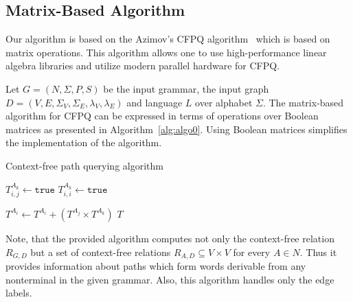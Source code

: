 \subsection{Matrix-Based Algorithm}
Our algorithm is based on the Azimov's CFPQ algorithm~\cite{Azimov:2018:CPQ:3210259.3210264} which is based on matrix operations.
This algorithm allows one to use high-performance linear algebra libraries and utilize modern parallel hardware for CFPQ.

Let $G = (N, \Sigma, P, S)$ be the input grammar, the input  graph $D = (V, E, \Sigma_V, \Sigma_E, \lambda_V, \lambda_E)$ and language $L$ over alphabet $\Sigma$.
The matrix-based algorithm for CFPQ can be expressed in terms of operations over Boolean matrices as presented in Algorithm~\ref{alg:algo0}.
Using Boolean matrices simplifies the implementation of the algorithm.

{
\begin{algorithm}
\begin{algorithmic}[1]
\caption{Context-free path querying algorithm}
\label{alg:algo0}
          {$T^{A_k}_{i,j} \gets \texttt{true}$}
    \EndFor
            {$T^{A_k}_{i,i} \gets \texttt{true}$}
        \EndFor
    \EndFor

          { $T^{A_i} \gets T^{A_i} + (T^{A_j} \times T^{A_k})$ }
        \EndFor
    \EndWhile
\State \Return $T$
\EndFunction
\end{algorithmic}
\end{algorithm}
}

Note, that the provided algorithm computes not only the context-free relation $R_{G,D}$ but a set of context-free relations $R_{A,D} \subseteq V \times V$ for every $A \in N$.
Thus it provides information about paths which form words derivable from any nonterminal in the given grammar.
Also, this algorithm handles only the edge labels.

